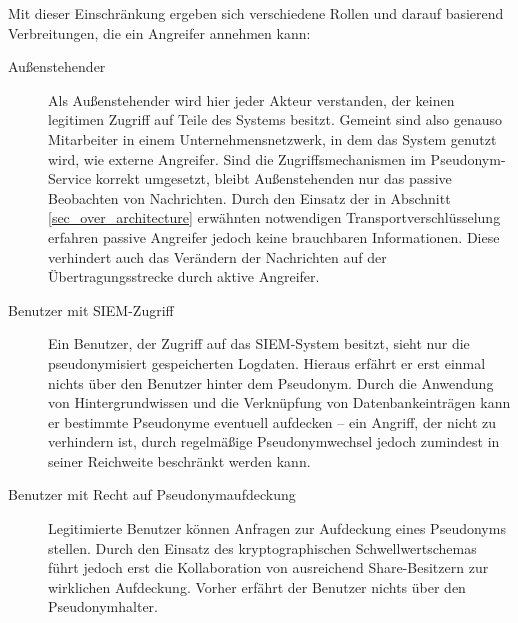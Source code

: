Mit dieser Einschränkung ergeben sich verschiedene Rollen und darauf basierend Verbreitungen, die ein Angreifer annehmen kann:

\begin{description}
  \item[Außenstehender] Als Außenstehender wird hier jeder Akteur verstanden, der keinen legitimen Zugriff auf Teile des Systems besitzt. Gemeint sind also genauso Mitarbeiter in einem Unternehmensnetzwerk, in dem das System genutzt wird, wie externe Angreifer. Sind die  Zugriffsmechanismen im Pseudonym-Service korrekt umgesetzt, bleibt Außenstehenden nur das passive Beobachten von Nachrichten. Durch den Einsatz der in Abschnitt \ref{sec_over_architecture} erwähnten notwendigen Transportverschlüsselung erfahren passive Angreifer jedoch keine brauchbaren Informationen. Diese verhindert auch das Verändern der Nachrichten auf der Übertragungsstrecke durch aktive Angreifer.
  
  \item[Benutzer mit SIEM-Zugriff] Ein Benutzer, der Zugriff auf das SIEM-System besitzt, sieht nur die pseudonymisiert gespeicherten Logdaten. Hieraus erfährt er erst einmal nichts über den Benutzer hinter dem Pseudonym. Durch die Anwendung von Hintergrundwissen und die Verknüpfung von Datenbankeinträgen kann er bestimmte Pseudonyme eventuell aufdecken -- ein Angriff, der nicht zu verhindern ist, durch regelmäßige Pseudonymwechsel jedoch zumindest in seiner Reichweite beschränkt werden kann.
  
  \item[Benutzer mit Recht auf Pseudonymaufdeckung] Legitimierte Benutzer können Anfragen zur Aufdeckung eines Pseudonyms stellen. Durch den Einsatz des kryptographischen Schwellwertschemas führt jedoch erst die Kollaboration von ausreichend Share-Besitzern zur wirklichen Aufdeckung. Vorher erfährt der Benutzer nichts über den Pseudonymhalter.
  

\end{description}

